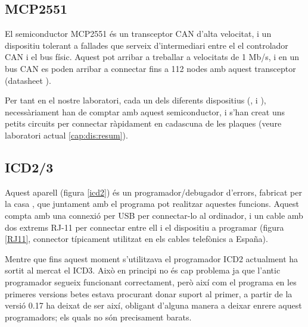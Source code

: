 \subsection{MCP2551}\label{cap:tec:hard:mcp2551}


El semiconductor MCP2551 és un transceptor CAN d'alta velocitat, i un dispositiu tolerant a fallades que serveix d'intermediari entre el el controlador CAN i el bus físic. Aquest pot arribar a treballar a velocitats de 1 Mb/s, i en un bus CAN es poden arribar a connectar fins a 112 nodes amb aquest transceptor (datasheet \cite{MCP2551}).

Per tant en el nostre laboratori, cada un dels diferents dispositius (\Monitor, \SensorActuador i \Controlador), necessàriament han de comptar amb aquest semiconductor, i s'han creat uns petits circuits per connectar ràpidament en cadascuna de les plaques \FLEX (veure laboratori actual \ref{cap:dis:resum}).

\subsection{ICD2/3}\label{cap:tec:hard:icd}


Aquest aparell (figura \ref{icd2}) és un programador/debugador d'errors, fabricat per la casa \Microchip, que juntament amb el programa \MplabX pot realitzar aquestes funcions. Aquest compta amb una connexió per USB per connectar-lo al ordinador, i un cable amb dos extrems RJ-11 per connectar entre ell i el dispositiu a programar (figura \ref{RJ11}, connector típicament utilitzat en els cables telefònics a España).


Mentre que fins aquest moment s'utilitzava el programador ICD2 actualment ha sortit al mercat el ICD3. Això en principi no és cap problema ja que l'antic programador segueix funcionant correctament, però així com el programa \MplabX en les primeres versions betes estava procurant donar suport al primer, a partir de la versió 0.17 ha deixat de ser així, obligant d'alguna manera a deixar enrere aquest programadors; els quals no són precisament barats.



